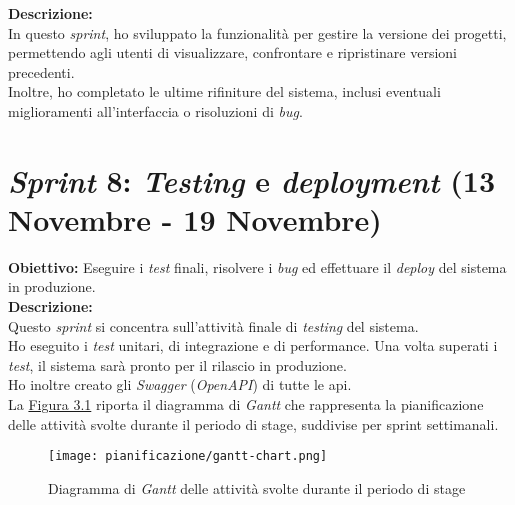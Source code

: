 \noindent \textbf{Descrizione:}\\
\noindent In questo \textit{sprint}, ho sviluppato la funzionalità per gestire la versione dei progetti, permettendo agli utenti di visualizzare, confrontare e ripristinare versioni precedenti.\\
Inoltre, ho completato le ultime rifiniture del sistema, inclusi eventuali miglioramenti all'interfaccia o risoluzioni di \textit{bug}.\\
\pagebreak
\section*{\textit{Sprint} 8: \textit{Testing} e \textit{deployment} (13 Novembre - 19 Novembre)}
\textbf{Obiettivo:} Eseguire i \textit{test} finali, risolvere i \textit{bug} ed effettuare il \textit{deploy} del sistema in produzione.\\

\noindent \textbf{Descrizione:}\\
\noindent Questo \textit{sprint} si concentra sull'attività finale di \textit{testing} del sistema.\\
Ho eseguito i \textit{test} unitari, di integrazione e di performance. Una volta superati i \textit{test}, il sistema sarà pronto per il rilascio in produzione. \\
Ho inoltre creato gli \textit{Swagger} (\textit{OpenAPI}) di tutte le \gls{api}.\\

\noindent La {\hyperref[fig:gantt-chart]{Figura 3.1}} riporta il diagramma di \textit{Gantt} che rappresenta la pianificazione delle attività svolte durante il periodo di stage, suddivise per \gls{sprint} settimanali.\\

\begin{figure}[H]
    \texttt{[image: pianificazione/gantt-chart.png]}
    \caption{Diagramma di \textit{Gantt} delle attività svolte durante il periodo di stage}
    \label{fig:gantt-chart}
\end{figure}